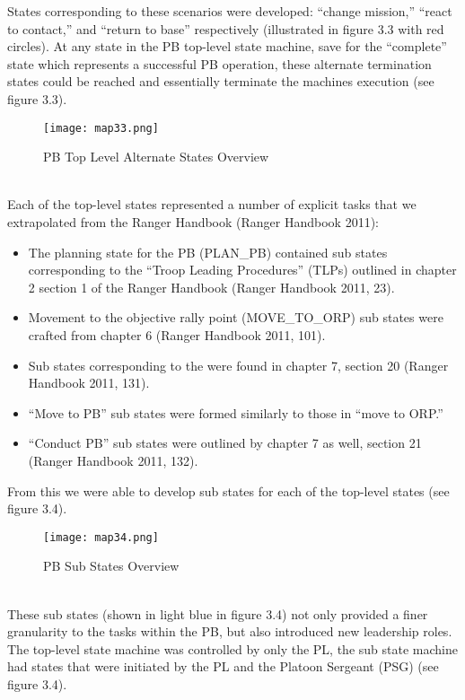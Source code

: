 States corresponding to these scenarios were developed: “change mission,”
“react to contact,” and “return to base” respectively (illustrated in figure
3.3 with red circles). At any state in the PB top-level state machine, save
for the “complete” state which represents a successful PB operation, these
alternate termination states could be reached and essentially terminate the
machines execution (see figure 3.3).\\
\begin{figure}[h]
  \centering
  \texttt{[image: map33.png]}
  \caption{PB Top Level Alternate States Overview}
\end{figure}\\
Each of the top-level states represented a number of explicit tasks that
we extrapolated from the Ranger Handbook (Ranger Handbook 2011):
\begin{itemize}
\item The planning state for the PB (PLAN_PB) contained sub states
  corresponding to the “Troop Leading Procedures” (TLPs) outlined in
  chapter 2 section 1 of the Ranger Handbook (Ranger Handbook 2011, 23).
\item Movement to the objective rally point (MOVE_TO_ORP) sub
  states were crafted from chapter 6 (Ranger Handbook 2011, 101).
\item Sub states corresponding to the were found in chapter 7,
  section 20 (Ranger Handbook 2011, 131).
\item “Move to PB” sub states were formed similarly to those in “move to ORP.”
\item “Conduct PB” sub states were outlined by chapter 7 as well, section 21
  (Ranger Handbook 2011, 132).
\end{itemize}
From this we were able to develop sub states for each of the top-level
states (see figure 3.4).\\
\begin{figure}[h]
  \centering
  \texttt{[image: map34.png]}
  \caption{PB Sub States Overview}
\end{figure}\\
These sub states (shown in light blue in figure 3.4) not only provided a
finer granularity to the tasks within the PB, but also introduced new leadership
roles. The top-level state machine was controlled by only the PL, the sub state
machine had states that were initiated by the PL and the Platoon Sergeant (PSG)
(see figure 3.4).\\ \\
